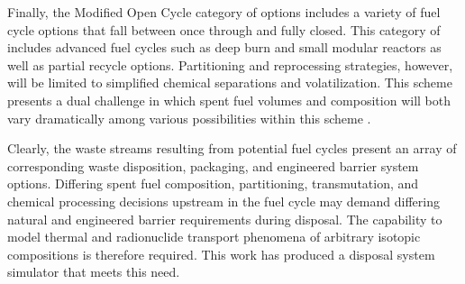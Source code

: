 
Finally, the Modified Open Cycle category of options includes a variety of fuel 
cycle options that fall between once through and fully closed. This category of 
includes advanced fuel cycles such as deep burn and small modular reactors as 
well as partial recycle options.  Partitioning and reprocessing strategies, 
however, will be limited to simplified chemical separations and volatilization. 
This scheme presents a dual challenge in which spent fuel volumes and 
composition will both vary dramatically among various possibilities within 
this scheme \cite{doe_nuclear_2010} .


Clearly, the waste streams resulting from potential fuel cycles present an 
array of corresponding waste disposition, packaging, and engineered barrier 
system options. Differing spent fuel composition, partitioning, transmutation, 
and chemical processing decisions upstream in the fuel cycle may demand differing 
natural and engineered barrier requirements during disposal. The 
capability to model thermal and radionuclide transport phenomena of 
arbitrary isotopic compositions is therefore required. This work has produced a 
disposal system simulator that meets this need. 

